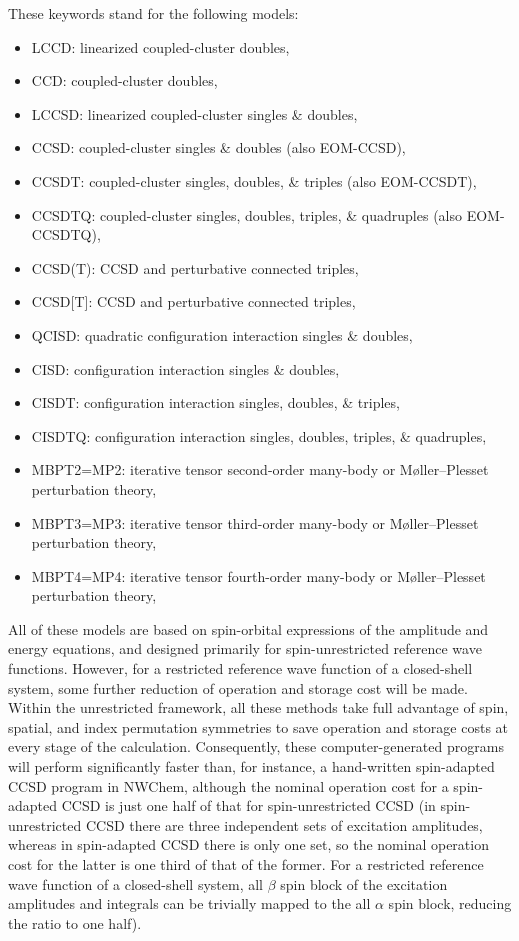 These keywords stand for the following models:
\begin{itemize}
\item LCCD: linearized coupled-cluster doubles,
\item CCD: coupled-cluster doubles,
\item LCCSD: linearized coupled-cluster singles \& doubles,
\item CCSD: coupled-cluster singles \& doubles (also EOM-CCSD),
\item CCSDT: coupled-cluster singles, doubles, \& triples (also EOM-CCSDT),
\item CCSDTQ: coupled-cluster singles, doubles, triples, \& quadruples (also EOM-CCSDTQ),
\item CCSD(T): CCSD and perturbative connected triples,
\item CCSD[T]: CCSD and perturbative connected triples,
\item QCISD: quadratic configuration interaction singles \& doubles,
\item CISD: configuration interaction singles \& doubles,
\item CISDT: configuration interaction singles, doubles, \& triples,
\item CISDTQ: configuration interaction singles, doubles, triples, \& quadruples,
\item MBPT2=MP2: iterative tensor second-order many-body or M\o ller--Plesset perturbation theory,
\item MBPT3=MP3: iterative tensor third-order many-body or M\o ller--Plesset perturbation theory,
\item MBPT4=MP4: iterative tensor fourth-order many-body or M\o ller--Plesset perturbation theory,
\end{itemize}

All of these models are based on spin-orbital expressions of the amplitude and energy equations, 
and designed primarily for spin-unrestricted reference wave functions.  However, for a restricted 
reference wave function of a closed-shell system, some further reduction of operation and storage
cost will be made.  Within the unrestricted framework, all these methods take full advantage
of spin, spatial, and index permutation symmetries to save operation and storage costs at every
stage of the calculation.  Consequently, these computer-generated programs will perform significantly
faster than, for instance, a hand-written spin-adapted CCSD program in NWChem, although the nominal 
operation cost for a spin-adapted CCSD is just one half of that for spin-unrestricted CCSD (in spin-unrestricted
CCSD there are three independent sets of excitation amplitudes, whereas in spin-adapted CCSD there
is only one set, so the nominal operation cost for the latter is one third of that of the former.  For 
a restricted reference wave function of a closed-shell system, all $\beta$ spin block of the excitation
amplitudes and integrals can be trivially mapped to the all $\alpha$ spin block, reducing the ratio
to one half).

